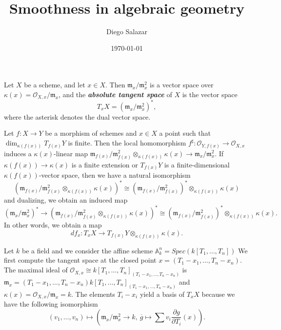 \documentclass[a4paper, 12pt]{amsart}
\newcommand{\defterm}[1]{\textbf{\textit{#1}}\index{#1}}
\theoremstyle{remark}
\begin{document}
\title{Smoothness in algebraic geometry}
\author{Diego Salazar}
\date{\today}
\maketitle

Let $X$ be a scheme, and let $x \in X$.
Then $\mathfrak{m}_x/\mathfrak{m}_x^2$ is a vector space over $\kappa(x) = \mathcal{O}_{X, x}/\mathfrak{m}_x$, and the \defterm{absolute tangent space} of $X$ is the vector space
\begin{equation}
  \label{eq:1}
  T_xX = (\mathfrak{m}_x/\mathfrak{m}_x^2)^*,
\end{equation}
where the asterisk denotes the dual vector space.

Let $f: X \to Y$ be a morphism of schemes and $x \in X$ a point such that $\dim_{\kappa(f(x))}T_{f(x)}Y$ is finite.
Then  the local homomorphism $f^\sharp: \mathcal{O}_{Y, f(x)} \to \mathcal{O}_{X, x}$ induces a $\kappa(x)$-linear map $\mathfrak{m}_{f(x)}/\mathfrak{m}^2_{f(x)}\otimes_{\kappa(f(x))}\kappa(x) \to \mathfrak{m}_x/\mathfrak{m}_x^2$.
If $\kappa(f(x)) \to \kappa(x)$ is a finite extension or $T_{f(x)}Y$ is a finite-dimensional $\kappa(f(x))$-vector space, then we have a natural isomorphism
\begin{equation*}
  (\mathfrak{m}_{f(x)}/\mathfrak{m}^2_{f(x)}\otimes_{\kappa(f(x))}\kappa(x))^* \cong (\mathfrak{m}_{f(x)}/\mathfrak{m}^2_{f(x)})^*\otimes_{\kappa(f(x))}\kappa(x)
\end{equation*}
and dualizing, we obtain an induced map
\begin{equation*}
  (\mathfrak{m}_x/\mathfrak{m}_x^2)^* \to (\mathfrak{m}_{f(x)}/\mathfrak{m}^2_{f(x)}\otimes_{\kappa(f(x))}\kappa(x))^* \cong (\mathfrak{m}_{f(x)}/\mathfrak{m}^2_{f(x)})^*\otimes_{\kappa(f(x))}\kappa(x).
\end{equation*}
In other words, we obtain a map
\begin{equation*}
  df_x: T_xX \to T_{f(x)}Y \otimes_{\kappa(f(x))} \kappa(x).
\end{equation*}

Let $k$ be a field and we consider the affine scheme $\mathbb{A}^n_k = Spec(k[T_1, \dots, T_n])$
We first compute the tangent space at the closed point $x = (T_1 - x_1, \dots, T_n - x_n)$.
The maximal ideal of $\mathcal{O}_{X, x} \cong k[T_1, \dots, T_n]_{(T_1 - x_1, \dots, T_n - x_n)}$ is $\mathfrak{m}_x = (T_1 - x_1, \dots, T_n - x_n)k[T_1, \dots, T_n]_{(T_1 - x_1, \dots, T_n - x_n)}$ and $\kappa(x) = \mathcal{O}_{X, x}/\mathfrak{m}_x = k$.
The elements $T_i - x_i$ yield a basis of $T_xX$ because we have the following isomorphism
\begin{equation*}
  (v_1, \dots, v_n) \mapsto \left( \mathfrak{m}_x / \mathfrak{m}_x^2 \to k, \ \overline{g} \mapsto \sum v_i \frac{\partial g}{\partial T_i}(x) \right).
\end{equation*}
\end{document}
